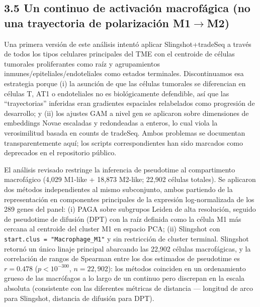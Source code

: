 \documentclass[12pt,a4paper]{article}
\begin{document}
\subsection*{3.5 Un continuo de activación macrofágica (no una trayectoria de polarización M1$\to$M2)}
Una primera versión de este análisis intentó aplicar Slingshot+tradeSeq a través de todos los tipos celulares principales del TME con el centroide de células tumorales proliferantes como raíz y agrupamientos inmunes/epiteliales/endoteliales como estados terminales. Discontinuamos esa estrategia porque (i) la asunción de que las células tumorales se diferencian en células T, AT1 o endoteliales no es biológicamente defendible, así que las ``trayectorias'' inferidas eran gradientes espaciales relabelados como progresión de desarrollo; y (ii) los ajustes GAM a nivel gen se aplicaron sobre dimensiones de embeddings Novae escaladas y redondeadas a enteros, lo cual viola la verosimilitud basada en counts de tradeSeq. Ambos problemas se documentan transparentemente aquí; los scripts correspondientes han sido marcados como deprecados en el repositorio público.

El análisis revisado restringe la inferencia de pseudotime al compartimento macrofágico (4,029 M1-like + 18,873 M2-like; 22,902 células totales). Se aplicaron dos métodos independientes al mismo subconjunto, ambos partiendo de la representación en componentes principales de la expresión log-normalizada de los 289 genes del panel: (i) PAGA \citep{wolf2019paga} sobre subgrupos Leiden de alta resolución, seguido de pseudotime de difusión (DPT) \citep{haghverdi2016dpt} con la raíz definida como la célula M1 más cercana al centroide del cluster M1 en espacio PCA; (ii) Slingshot \citep{street2018slingshot} con \texttt{start.clus = "Macrophage\_M1"} y sin restricción de cluster terminal. Slingshot retornó un único linaje principal abarcando las 22,902 células macrofágicas, y la correlación de rangos de Spearman entre los dos estimados de pseudotime es $r = 0.478$ ($p < 10^{-300}$, $n = 22{,}902$): los métodos coinciden en un ordenamiento grueso de las macrófagos a lo largo de un continuo pero discrepan en la escala absoluta (consistente con las diferentes métricas de distancia --- longitud de arco para Slingshot, distancia de difusión para DPT).
\end{document}
